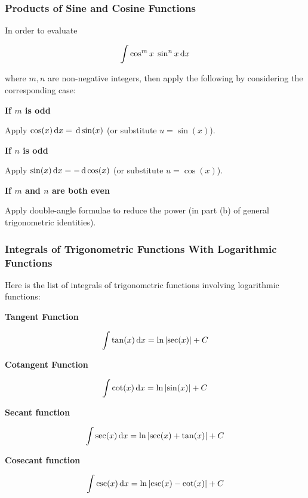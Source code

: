 \documentclass[a4paper,12pt]{article}
\begin{document}
\subsubsection{Products of Sine and Cosine Functions}
In order to evaluate

$$\int\cos^{m}x\;\sin^{n}x\,\mathrm{d} x$$\s

where $m,n$ are non-negative integers, then apply the following by considering the corresponding case:

\begin{alist}
  \item \textbf{If $m$ is odd}\n

  Apply $\cos(x)\,\mathrm{d} x=\,\mathrm{d}\sin(x)$ (or substitute $u=\sin(x)$).

  \item \textbf{If $n$ is odd}\n

  Apply $\sin(x)\,\mathrm{d} x=-\,\mathrm{d}\cos(x)$ (or substitute $u=\cos(x)$).

  \item \textbf{If $m$ and $n$ are both even}\n

  Apply double-angle formulae to reduce the power (in part (b) of general trigonometric identities).
\end{alist}

\subsubsection{Integrals of Trigonometric Functions With Logarithmic Functions}
Here is the list of integrals of trigonometric functions involving logarithmic functions:

\begin{alist}
  \item \textbf{Tangent Function}\n

  $$\int\tan(x)\,\mathrm{d} x=\ln\left| \sec(x)\right|+C$$

  \item \textbf{Cotangent Function}\n

  $$\int\cot(x)\,\mathrm{d} x=\ln\left| \sin(x)\right|+C$$

  \item \textbf{Secant function}\n

  $$\int\sec(x)\,\mathrm{d} x=\ln\left| \sec(x)+\tan(x)\right|+C$$

  \item \textbf{Cosecant function}\n

  $$\int\csc(x)\,\mathrm{d} x=\ln\left| \csc(x)-\cot(x)\right|+C$$
\end{alist}
\end{document}

